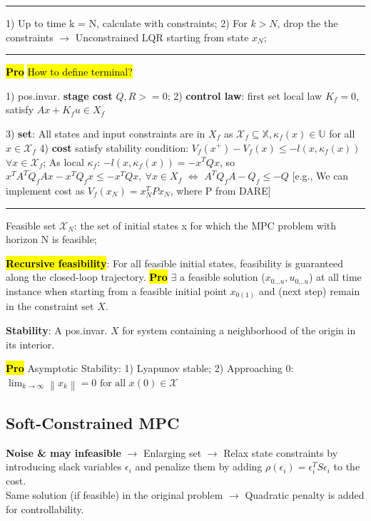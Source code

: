 \documentclass[10pt,a4paper,landscape]{article}
\newcommand{\hlc}[2][yellow]{ {\sethlcolor{#1} \hl{#2}} }
\newcommand{\quadRule}{\vspace{-3pt}\rule{0.23\textwidth}{0.4pt}}
\newcommand{\prove}{\footnotesize{\hlc[pink]{\textbf{Pro}}}} %
\begin{document}
\begin{multicols*}{4}
\quadRule

1) Up to time k = N, calculate with constraints; 2) For $k >N$, drop the the constraints $\rightarrow$ Unconstrained LQR starting from state $x_N$; 

\quadRule

\prove \hl{How to define terminal?} 

1) pos.invar. \textbf{stage cost} $Q,R >=0$;
2) \textbf{control law}: first set local law $K_f=0$, satisfy $Ax + K_fu \in X_f$

3) \textbf{set}: All states and input constraints are in $X_f$ as $\mathcal{X}_{f} \subseteq \mathbb{X}, \kappa_{f}(x) \in \mathbb{U}$ for all $x \in \mathcal{X}_{f}$
4) \textbf{cost} satisfy stability condition: $V_{f}\left(x^{+}\right)-V_{f}(x) \leq-l\left(x, \kappa_{f}(x)\right)$ $\forall x \in \mathcal{X}_{f}$; 
As local $\kappa_f$: $-l\left(x, \kappa_{f}(x)\right) = -x^TQx$, so $x^TA^TQ_fAx -x^TQ_fx \leq -x^TQx, \ \forall x \in X_f$ $\iff$
$A^TQ_fA -Q_f \leq -Q$
[e.g., We can implement cost as $V_f(x_N) = x_N^T P x_N$, where P from DARE]

\quadRule

Feasible set $\mathcal{X}_N$: the set of initial states x for which the MPC problem with horizon N is feasible; 

\hl{\textbf{Recursive feasibility}}: For all feasible initial states, feasibility is guaranteed along the closed-loop trajectory.
\prove $\exists$ a feasible solution ($x_{0...u}, u_{0...u}$) at all time instance when starting from a feasible initial point $x_{0(1)}$ and (next step) remain in the constraint set $X$.

\textbf{Stability}: A pos.invar. $X$ for system containing a neighborhood of the origin in its interior.

\prove Asymptotic Stability: 1) Lyapunov stable; 2) Approaching 0: $\lim _{k \rightarrow \infty}\left\|x_{k}\right\|=0 \text { for all } x(0) \in \mathcal{X}$

\subsection{Soft-Constrained MPC}
\textbf{Noise \& may infeasible} $\rightarrow$ Enlarging set $\rightarrow$ Relax state constraints by introducing slack variables $\epsilon_i$ and penalize them by adding $\rho(\epsilon_i) = \epsilon_i^T S \epsilon_i$ to the cost.\\
Same solution (if feasible) in the original problem $\rightarrow$ Quadratic penalty is added for controllability.


\end{multicols*}
\end{document}
